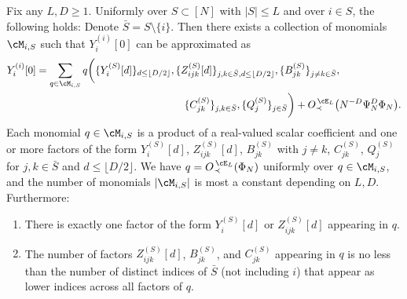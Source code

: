 \begin{lemma}\label{lemm:FAexpansion}
Fix any $L,D \geq 1$. Uniformly over $S \subset [N]$ with $|S| \leq L$ and over
$i \in S$, the following holds: Denote $\bar S=S \setminus \{i\}$. Then there exists
a collection of monomials $\cM_{i,S}$ such that
$Y_i^{(i)}[0]$ can be approximated as
\begin{align}
Y_{i}^{(i)}[0]&=\sum_{q \in \cM_{i,S}}
q\bigg(\{Y_i^{(S)}[d]\}_{d \leq \lfloor D/2 \rfloor},
\{Z_{ijk}^{(S)}[d]\}_{j,k \in \bar S, d \leq \lfloor D/2 \rfloor},
\{B_{jk}^{(S)}\}_{j \neq k \in \bar S},\nonumber\\
&\hspace{2in}\{C_{jk}^{(S)}\}_{j,k\in \bar S},\{Q_j^{(S)}\}_{j \in \bar S}\bigg)
+\SDcEL{N^{-D}\Psi_N^D\Phi_N}.\label{eq:FAexpansionrepr}
\end{align}
Each monomial $q \in \cM_{i,S}$ is a product of a real-valued scalar coefficient
and one or more factors of the form
$Y_i^{(S)}[d]$, $Z_{ijk}^{(S)}[d]$, $B_{jk}^{(S)}$ with $j \neq k$,
$C_{jk}^{(S)}$, $Q_j^{(S)}$ for $j,k \in \bar S$ and $d \leq \lfloor D/2 \rfloor$.
We have $q=\SDcEL{\Phi_N}$ uniformly over $q \in \cM_{i,S}$,
and the number of monomials $|\cM_{i,S}|$ is most a constant depending on
$L,D$. Furthermore:
\begin{enumerate}[label=(\alph*)]
\item There is exactly one factor of the form $Y_i^{(S)}[d]$ or
$Z_{ijk}^{(S)}[d]$ appearing in $q$.
\item The number of factors $Z_{ijk}^{(S)}[d]$,
$B_{jk}^{(S)}$, and $C_{jk}^{(S)}$ appearing in $q$ is no less than the number
of distinct indices of $\bar S$ (not including $i$) that appear as lower
indices across all factors of $q$.
\end{enumerate}
\end{lemma}
